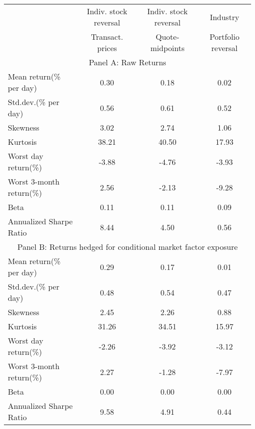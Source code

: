 \begin{tabular}{lccc}
    \toprule
    & Indiv. stock reversal & Indiv. stock reversal & Industry \\
    & Transact. prices & Quote-midpoints & Portfolio reversal \\
    \midrule
    \multicolumn{4}{c}{Panel A: Raw Returns} \\
    \midrule
    Mean return(\% per day) & 0.30 & 0.18 & 0.02 \\
    Std.dev.(\% per day) & 0.56 & 0.61 & 0.52 \\
    Skewness & 3.02 & 2.74 & 1.06 \\
    Kurtosis & 38.21 & 40.50 & 17.93 \\
    Worst day return(\%) & -3.88 & -4.76 & -3.93 \\
    Worst 3-month return(\%) & 2.56 & -2.13 & -9.28 \\
    Beta & 0.11 & 0.11 & 0.09 \\
    Annualized Sharpe Ratio & 8.44 & 4.50 & 0.56 \\
    \midrule
    \multicolumn{4}{c}{Panel B: Returns hedged for conditional market factor exposure} \\
    \midrule
    Mean return(\% per day) & 0.29 & 0.17 & 0.01 \\
    Std.dev.(\% per day) & 0.48 & 0.54 & 0.47 \\
    Skewness & 2.45 & 2.26 & 0.88 \\
    Kurtosis & 31.26 & 34.51 & 15.97 \\
    Worst day return(\%) & -2.26 & -3.92 & -3.12 \\
    Worst 3-month return(\%) & 2.27 & -1.28 & -7.97 \\
    Beta & 0.00 & 0.00 & 0.00 \\
    Annualized Sharpe Ratio & 9.58 & 4.91 & 0.44 \\
    \bottomrule
    \end{tabular}